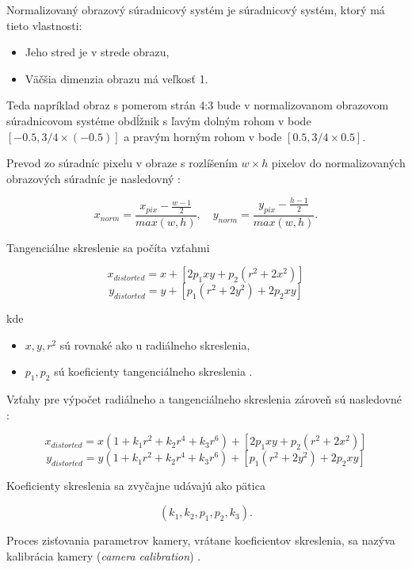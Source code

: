 Normalizovaný obrazový súradnicový systém je súradnicový systém, ktorý má tieto vlastnosti:
\begin{itemize}
    \item Jeho stred je v strede obrazu,
    \item Väčšia dimenzia obrazu má veľkosť 1.
\end{itemize}

Teda napríklad obraz s pomerom strán 4:3 bude v normalizovanom obrazovom súradnicovom systéme obdĺžnik s ľavým dolným rohom v bode $[-0.5, 3/4 \times (-0.5)]$ a pravým horným rohom v bode $[0.5, 3/4 \times 0.5]$.

Prevod zo súradníc pixelu v obraze s rozlíšením $w \times h$ pixelov do normalizovaných obrazových súradníc je nasledovný \cite{opensfm_coordinate_systems}:

$$
x_{norm} = \frac{x_{pix} - \frac{w-1}{2}}{max(w, h)}
\mathrm{,} \quad
y_{norm} = \frac{y_{pix} - \frac{h-1}{2}}{max(w, h)}
\mathrm{.}
$$

Tangenciálne skreslenie sa počíta vzťahmi

$$x_{distorted} = x + [2 p_1 x y + p_2(r^2 + 2 x^2)]$$
$$y_{distorted} = y + [ p_1(r^2 + 2 y^2) + 2 p_2 x y]$$

kde

\begin{itemize}
    \item $x, y, r^2$ sú rovnaké ako u radiálneho skreslenia,
    \item $p_1, p_2$ sú koeficienty tangenciálneho skreslenia \cite{opencv_camera_calibration}.
\end{itemize}

Vzťahy pre výpočet radiálneho a tangenciálneho skreslenia zároveň sú nasledovné \cite{sun_cooperstock_camera_calibration}:

$$x_{distorted} = x(1 + k_1 r^2 + k_2 r^4 + k_3 r^6) + [2 p_1 x y + p_2(r^2 + 2 x^2)]$$
$$y_{distorted} = y(1 + k_1 r^2 + k_2 r^4 + k_3 r^6) + [ p_1(r^2 + 2 y^2) + 2 p_2 x y]$$

Koeficienty skreslenia sa zvyčajne udávajú ako pätica \cite{opencv_camera_calibration}

$$(k_1, k_2, p_1, p_2, k_3)\mathrm{.}$$

Proces zisťovania parametrov kamery, vrátane koeficientov skreslenia, sa nazýva kalibrácia kamery (\emph{camera calibration}) \cite{matlab_camera_calibration}.

